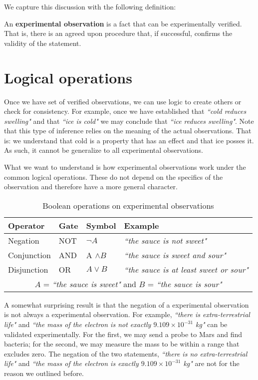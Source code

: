 \documentclass[11pt,letterpaper,fleqn]{memoir} %
\begin{document}
We capture this discussion with the following definition:
\begin{defn}
An \textbf{experimental observation} is a fact that can be experimentally verified. That is, there is an agreed upon procedure that, if successful, confirms the validity of the statement.
\end{defn}

\section{Logical operations}

Once we have set of verified observations, we can use logic to create others or check for consistency. For example, once we have established that \emph{``cold reduces swelling"} and that \emph{``ice is cold"} we may conclude that \emph{``ice 
reduces swelling"}. Note that this type of inference relies on the meaning of the actual observations. That is: we understand that cold is a property that has an effect and that ice posses it. As such, it cannot be generalize to all experimental observations.

What we want to understand is how experimental observations work under the common logical operations. These do not depend on the specifics of the observation and therefore have a more general character.
\begin{table}[h]
	\centering
	\begin{tabular}{p{} p{} p{} p{}}
		Operator & Gate & Symbol & Example \\ 
		\hline 
		Negation & NOT & $\neg A$ &  \emph{``the sauce is not sweet"} \\ 
		Conjunction & AND & A $\wedge B$ & \emph{``the sauce is sweet and sour"} \\ 
		Disjunction & OR & $A \vee B$ & \emph{``the sauce is at least sweet or sour"}\\
		\multicolumn{4}{c}{  $A$ = \emph{``the sauce is sweet"} and $B$ = \emph{``the sauce is sour"}}
	\end{tabular} 
	\caption{Boolean operations on experimental observations}
\end{table}

A somewhat surprising result is that the negation of a experimental observation is not always a experimental observation. For example, \emph{``there is extra-terrestrial life"} and \emph{``the mass of the electron is not exactly $9.109 \times 10^{-31}$ kg"} can be validated experimentally. For the first, we may send a probe to Mars and find bacteria; for the second, we may measure the mass to be within a range that excludes zero. The negation of the two statements,  \emph{``there is no extra-terrestrial life"} and \emph{``the mass of the electron is exactly $9.109 \times 10^{-31}$ kg"} are not for the reason we outlined before.
\end{document}
